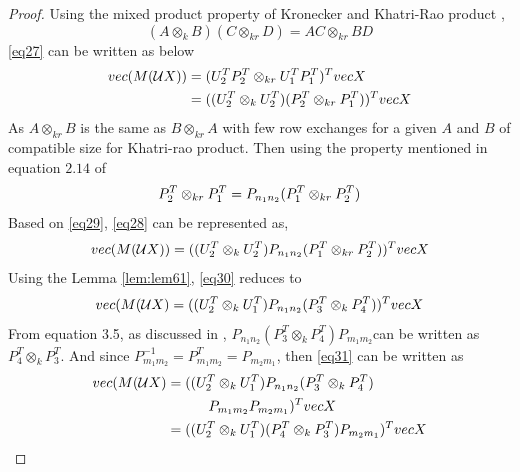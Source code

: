 \documentclass{article}
\begin{document}
\begin{proof}
    Using the mixed product property of Kronecker and
Khatri-Rao product \cite{Krprop},
\begin{equation*}
    (A\otimes_kB)(C\otimes_{kr}D)= AC\otimes_{kr}BD
\end{equation*}
\eqref{eq27} can be written as below
\begin{equation}{\label{eq28}}
\begin{split}
    vec(M(\mathcal{U}X))
               &=(U_2^TP_2^T\otimes_{kr} U_1^TP_1^T)^T vecX\\
               &=((U_2^T \otimes_k U_2^T)(P_2^T\otimes_{kr}P_1^T))^TvecX
\end{split}                   
\end{equation}
As $A\otimes_{kr}B$ is the same as $B\otimes_{kr}A$ with few row exchanges for a given $A$ and $B$ of compatible size for Khatri-rao product. Then using the property mentioned in equation $2.14$ of \cite{KronStat}
\begin{equation}{\label{eq29}}
    P_2^T \otimes_{kr} P_1^T = P_{n_1n_2}(P_1^T \otimes_{kr} P_2^T)
\end{equation}
Based on \eqref{eq29}, \eqref{eq28} can be represented as,
\begin{equation}{\label{eq30}}
    vec(M(\mathcal{U}X)) =((U_2^T \otimes_k U_2^T)P_{n_1n_2}(P_1^T\otimes_{kr}P_2^T))^TvecX\\
\end{equation}
Using the Lemma \ref{lem:lem61}, \eqref{eq30} reduces to 
\begin{equation}{\label{eq31}}
    \begin{split}
    vec(M(\mathcal{U}X)&= ((U_2^T \otimes_k U_1^T)P_{n_1n_2}(P_3^T\otimes_{k}P_4^T))^TvecX\\
\end{split}     
\end{equation}
 From equation 3.5, as discussed in \cite{MatrixProducts}, $P_{n_1n_2}(P_3^T\otimes_{k}P_4^T)P_{m_1m_2} $can be written as $ P_4^T\otimes_{k}P_3^T$. And since $P^{-1}_{m_1m_2}=P^T_{m_1m_2}=P_{m_2m_1}$, then \eqref{eq31} can be written as
 \begin{equation}{\label{eq32}}
    \begin{split}
    vec(M(\mathcal{U}X)&= ((U_2^T \otimes_k U_1^T)P_{n_1n_2}(P_3^T\otimes_{k}P_4^T)\\
             & \quad \quad \quad P_{m_1m_2}P_{m_2m_1})^TvecX\\
             &=((U_2^T \otimes_k U_1^T)(P_4^T\otimes_{k}P_3^T)P_{m_2m_1})^TvecX\\

\end{split}
\end{equation}
\end{proof}
\end{document}
